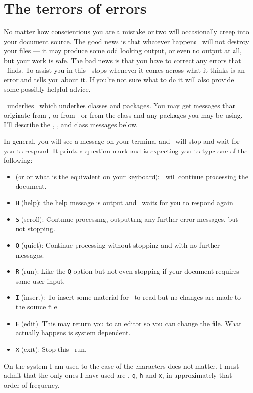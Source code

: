 \chapter{The terrors of errors} \label{chap:errors}

    No matter how conscientious you are a mistake or two will occasionally
creep into your document source. The good news is that whatever happens
\tx\ will not destroy your files --- it may produce some odd looking output,
or even no output at all, but your work is safe. The bad news is that you
have to correct any errors that \tx\ finds. To assist you in this \tx\ stops
whenever it comes across what it thinks is an error 
and tells you about it.
If you're not sure what to do it will also provide some possibly helpful 
advice.

    \tx\ underlies \ltx\ which underlies classes and packages. You may get
messages than originate from \tx, or from \ltx, or from the class and any
packages you may be using. I'll describe the \tx, \ltx, and class messages
below.

    In general, you will see a message 
on your terminal and \ltx\ will
stop and wait for you to respond. It prints a question mark and is 
expecting you to type one of the following:
\begin{itemize}
\item {} (or  or what is the equivalent on your
       keyboard): \ltx\ will continue 
      processing the document.
\item \texttt{H} (help): the help  
      message is output and \ltx\
      waits for you to respond again.
\item \texttt{S} (scroll): Continue  
      processing, outputting any
      further error messages, but not stopping.
\item \texttt{Q} (quiet): Continue
      processing without stopping
      and with no further messages.
\item \texttt{R} (run): Like   
      the \texttt{Q} option but not even
      stopping if your document requires some user input.
\item \texttt{I} (insert): To insert
      some material for \tx\ to
      read but no changes are made to the source file.
\item \texttt{E} (edit): This   
      may return you to an editor so you can
      change the file. What actually happens is system dependent.
\item \texttt{X} (exit): Stop\index{error message!response!exit}   
      this \ltx\ run.
\end{itemize}
On the system I am used to the case of the characters does not matter.
I must admit that the only ones I have used are \meta{return}, \texttt{q},
\texttt{h} and \texttt{x}, in approximately that order of frequency.

